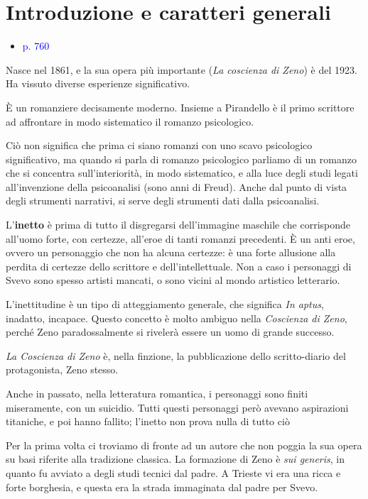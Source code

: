 \documentclass[a4paper, twoside, titlepage]{book}
\newcommand{\elenco}[1]{%
\begin{itemize}
#1
\end{itemize}}
\renewcommand{\emph}[1]{\textcolor{blue}{#1}}
\begin{document}
\chapter{Introduzione e caratteri generali}

\elenco{\item \emph{p. 760}}

Nasce nel 1861, e la sua opera più importante (\textit{La coscienza di Zeno}) è del 1923.
Ha vissuto diverse esperienze significativo.

È un romanziere decisamente moderno. Insieme a Pirandello è il primo scrittore ad affrontare in modo sistematico il romanzo psicologico.

Ciò non significa che prima ci siano romanzi con uno scavo psicologico significativo, ma quando si parla di romanzo psicologico parliamo di un romanzo che si concentra sull'interiorità, in modo sistematico, e alla luce degli studi legati all'invenzione della psicoanalisi (sono anni di Freud). Anche dal punto di vista degli strumenti narrativi, si serve degli strumenti dati dalla psicoanalisi.

L'\textbf{inetto} è prima di tutto il disgregarsi dell'immagine maschile che corrisponde all'uomo forte, con certezze, all'eroe di tanti romanzi precedenti.
È un anti eroe, ovvero un personaggio che non ha alcuna certezze: è una forte allusione alla perdita di certezze dello scrittore e dell'intellettuale.
Non a caso i personaggi di Svevo sono spesso artisti mancati, o sono vicini al mondo artistico letterario.

L'inettitudine è un tipo di atteggiamento generale, che significa \textit{In aptus}, inadatto, incapace.
Questo concetto è molto ambiguo nella \textit{Coscienza di Zeno}, perché Zeno paradossalmente si rivelerà essere un uomo di grande successo.

\textit{La Coscienza di Zeno} è, nella finzione, la pubblicazione dello scritto-diario del protagonista, Zeno stesso.

Anche in passato, nella letteratura romantica, i personaggi sono finiti miseramente, con un suicidio. Tutti questi personaggi però avevano aspirazioni titaniche, e poi hanno fallito; l'inetto non prova nulla di tutto ciò

Per la prima volta ci troviamo di fronte ad un autore che non poggia la sua opera su basi riferite alla tradizione classica. La formazione di Zeno è \textit{sui generis}, in quanto fu avviato a degli studi tecnici dal padre.
A Trieste vi era una ricca e forte borghesia, e questa era la strada immaginata dal padre per Svevo.
\end{document}
